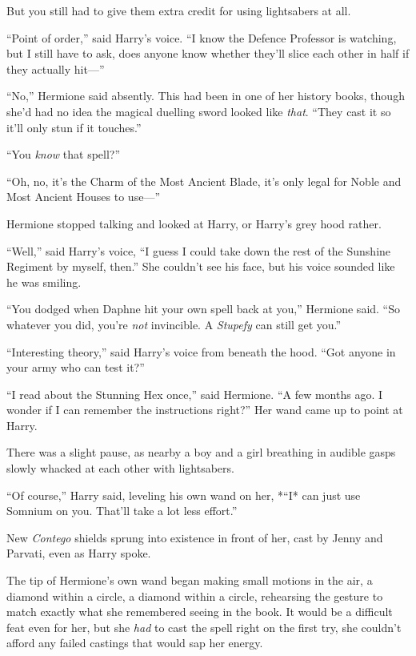 But you still had to give them extra credit for using lightsabers at
all.

``Point of order,'' said Harry's voice. ``I know the Defence Professor
is watching, but I still have to ask, does anyone know whether they'll
slice each other in half if they actually hit---''

``No,'' Hermione said absently. This had been in one of her history
books, though she'd had no idea the magical duelling sword looked like
\emph{that}. ``They cast it so it'll only stun if it touches.''

``You \emph{know} that spell?''

``Oh, no, it's the Charm of the Most Ancient Blade, it's only legal for
Noble and Most Ancient Houses to use---''

Hermione stopped talking and looked at Harry, or Harry's grey hood
rather.

``Well,'' said Harry's voice, ``I guess I could take down the rest of
the Sunshine Regiment by myself, then.'' She couldn't see his face, but
his voice sounded like he was smiling.

``You dodged when Daphne hit your own spell back at you,'' Hermione
said. ``So whatever you did, you're \emph{not} invincible. A
\emph{Stupefy} can still get you.''

``Interesting theory,'' said Harry's voice from beneath the hood. ``Got
anyone in your army who can test it?''

``I read about the Stunning Hex once,'' said Hermione. ``A few months
ago. I wonder if I can remember the instructions right?'' Her wand came
up to point at Harry.

There was a slight pause, as nearby a boy and a girl breathing in
audible gasps slowly whacked at each other with lightsabers.

``Of course,'' Harry said, leveling his own wand on her, *``I* can just
use Somnium on you. That'll take a lot less effort.''

New \emph{Contego} shields sprung into existence in front of her, cast
by Jenny and Parvati, even as Harry spoke.

The tip of Hermione's own wand began making small motions in the air, a
diamond within a circle, a diamond within a circle, rehearsing the
gesture to match exactly what she remembered seeing in the book. It
would be a difficult feat even for her, but she \emph{had} to cast the
spell right on the first try, she couldn't afford any failed castings
that would sap her energy.

